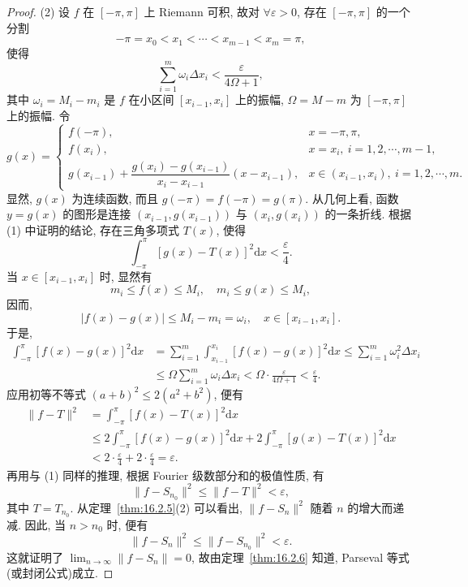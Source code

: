 \begin{proof}
(2) 设 $f$ 在 $[-\pi, \pi]$ 上 Riemann 可积, 故对 $\forall\varepsilon > 0$, 存在 $[-\pi, \pi]$ 的一个分割
\[
  -\pi=x_{0}<x_{1}<\cdots<x_{m-1}<x_{m}=\pi,
\]
使得
\[
  \sum_{i=1}^{m}\omega_{i}\Delta x_{i}<\frac{\varepsilon}{4\Omega+1},
\]
其中 $\omega_{i}=M_{i}-m_{i}$ 是 $f$ 在小区间 $[x_{i-1},x_{i}]$ 上的振幅, $\Omega=M-m$ 为 $[-\pi,\pi]$ 上的振幅. 令
\[
  g(x)=\begin{cases}
    f(-\pi), & x=-\pi,\pi,\\
    f(x_{i}), & x=x_i,\ i=1,2,\cdots,m-1,\\
    g(x_{i-1})+\dfrac{g(x_{i})-g(x_{i-1})}{x_{i}-x_{i-1}}(x-x_{i-1}), & x\in(x_{i-1},x_{i}),\ i=1,2,\cdots,m.
\end{cases}
\]
显然, $g(x)$ 为连续函数, 而且 $g(-\pi)=f(-\pi)=g(\pi)$. 从几何上看, 函数 $y=g(x)$ 的图形是连接 $(x_{i-1},g(x_{i-1}))$ 与 $(x_{i},g(x_{i}))$ 的一条折线. 根据 (1) 中证明的结论, 存在三角多项式 $T(x)$, 使得
\[
  \int_{-\pi}^{\pi}\left[g(x)-T(x)\right]^{2}\mathrm{d}x<\frac{\varepsilon}{4}.
\]
当 $x \in [x_{i-1}, x_{i}]$ 时, 显然有
\[
  m_{i}\leqslant f(x)\leqslant M_{i},\quad m_{i}\leqslant g(x)\leqslant M_i,
\]
因而,
\[
  |f(x)-g(x)|\leqslant M_{i}-m_{i}=\omega_{i},\quad x\in[x_{i-1},x_{i}].
\]
于是,
\[
  \begin{aligned}
    \int_{-\pi}^{\pi}\left[f(x)-g(x)\right]^{2}\mathrm{d}x&=\sum_{i=1}^{m}\int_{x_{i-1}}^{x_{i}}\left[f(x)-g(x)\right]^{2}\mathrm{d}x\leqslant\sum_{i=1}^{m}\omega_{i}^{2}\Delta x_{i}\\
    &\leqslant\Omega\sum_{i=1}^{m}\omega_{i}\Delta x_{i}<\Omega\cdot\frac{\varepsilon}{4\Omega+1}<\frac{\varepsilon}{4}.
  \end{aligned}
\]
应用初等不等式 $(a+b)^2 \leqslant 2(a^2+b^2)$, 便有
\[
  \begin{aligned}
    \| f-T\|^{2}&=\int_{-\pi}^{\pi}\left[f(x)-T(x)\right]^{2}\mathrm{d}x\\
    &\leqslant2\int_{-\pi}^{\pi}\left[f(x)-g(x)\right]^{2}\mathrm{d}x+2\int_{-\pi}^{\pi}\left[g(x)-T(x)\right]^{2}\mathrm{d}x\\
    &<2\cdot\frac{\varepsilon}{4}+2\cdot\frac{\varepsilon}{4}=\varepsilon.
  \end{aligned}
\]
再用与 (1) 同样的推理, 根据 Fourier 级数部分和的极值性质, 有
\[
  \| f-S_{n_{0}}\|^{2}\leqslant\| f-T\|^{2}<\varepsilon,
\]
其中 $T = T_{n_{0}}$. 从定理~\ref{thm:16.2.5}(2) 可以看出, $\| f - S_{n} \|^{2}$ 随着 $n$ 的增大而递减. 因此, 当 $n > n_{0}$ 时, 便有
\[
  \| f-S_{n}\|^{2}\leqslant\| f-S_{n_{0}}\|^{2}<\varepsilon.
\]
这就证明了 $\lim_{n\to\infty}\|f-S_n\|=0$, 故由定理~\ref{thm:16.2.6} 知道, Parseval 等式(或封闭公式)成立.


\end{proof}
